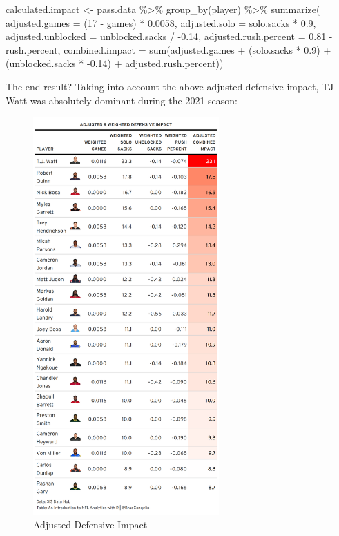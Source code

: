 \documentclass[
  letterpaper,
]{krantz}
\newenvironment{Shaded}{\begin{snugshade}}{\end{snugshade}}
\newcommand{\AttributeTok}[1]{\textcolor[rgb]{0.40,0.45,0.13}{#1}}
\newcommand{\DecValTok}[1]{\textcolor[rgb]{0.68,0.00,0.00}{#1}}
\newcommand{\FloatTok}[1]{\textcolor[rgb]{0.68,0.00,0.00}{#1}}
\newcommand{\FunctionTok}[1]{\textcolor[rgb]{0.28,0.35,0.67}{#1}}
\newcommand{\NormalTok}[1]{\textcolor[rgb]{0.00,0.23,0.31}{#1}}
\newcommand{\OtherTok}[1]{\textcolor[rgb]{0.00,0.23,0.31}{#1}}
\newcommand{\SpecialCharTok}[1]{\textcolor[rgb]{0.37,0.37,0.37}{#1}}
\begin{document}
\begin{Shaded}
\begin{Highlighting}[]
\NormalTok{calculated.impact }\OtherTok{\textless{}{-}}\NormalTok{ pass.data }\SpecialCharTok{\%\textgreater{}\%}
  \FunctionTok{group\_by}\NormalTok{(player) }\SpecialCharTok{\%\textgreater{}\%}
  \FunctionTok{summarize}\NormalTok{(}
    \AttributeTok{adjusted.games =}\NormalTok{ (}\DecValTok{17} \SpecialCharTok{{-}}\NormalTok{ games) }\SpecialCharTok{*} \FloatTok{0.0058}\NormalTok{,}
    \AttributeTok{adjusted.solo =}\NormalTok{ solo.sacks }\SpecialCharTok{*} \FloatTok{0.9}\NormalTok{,}
    \AttributeTok{adjusted.unblocked =}\NormalTok{ unblocked.sacks }\SpecialCharTok{/} \SpecialCharTok{{-}}\FloatTok{0.14}\NormalTok{,}
    \AttributeTok{adjusted.rush.percent =} \FloatTok{0.81} \SpecialCharTok{{-}}\NormalTok{ rush.percent,}
    \AttributeTok{combined.impact =} \FunctionTok{sum}\NormalTok{(adjusted.games }\SpecialCharTok{+} 
\NormalTok{                            (solo.sacks }\SpecialCharTok{*} \FloatTok{0.9}\NormalTok{) }\SpecialCharTok{+} 
\NormalTok{                            (unblocked.sacks }\SpecialCharTok{*} \SpecialCharTok{{-}}\FloatTok{0.14}\NormalTok{) }\SpecialCharTok{+} 
\NormalTok{                            adjusted.rush.percent))}
\end{Highlighting}
\end{Shaded}

The end result? Taking into account the above adjusted defensive impact,
TJ Watt was absolutely dominant during the 2021 season:

\begin{figure}

{\centering \includegraphics[width=2.8in,height=\textheight]{images/adjusteddefense.png}

}

\caption{Adjusted Defensive Impact}

\end{figure}
\end{document}
